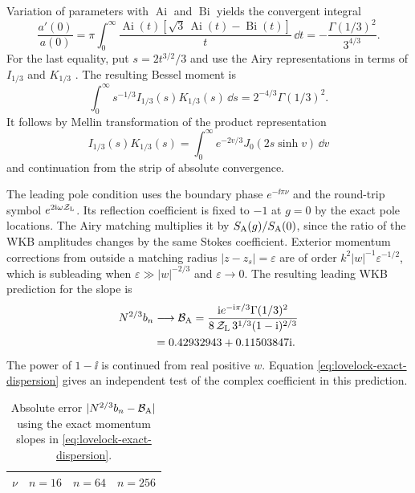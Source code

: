 Variation of parameters with \(\operatorname{Ai}\) and
\(\operatorname{Bi}\) yields the convergent integral
\begin{equation}
 \frac{a'(0)}{a(0)}
 =\pi\int_0^\infty\frac{\operatorname{Ai}(t)
 [\sqrt3\,\operatorname{Ai}(t)-\operatorname{Bi}(t)]}{t}\,\dd t
 =-\frac{\Gamma(1/3)^2}{3^{4/3}}.
 \label{eq:lovelock-airy-moment}
\end{equation}
For the last equality, put \(s=2t^{3/2}/3\) and use the Airy
representations in terms of \(I_{1/3}\) and \(K_{1/3}\) \cite{NIST:DLMF}.
The resulting Bessel moment is
\begin{equation}
 \int_0^\infty s^{-1/3} I_{1/3}(s)K_{1/3}(s)\,\dd s
 =2^{-4/3}\Gamma(1/3)^2.
\end{equation}
It follows by Mellin transformation of the product representation
\begin{equation}
 I_{1/3}(s)K_{1/3}(s)=\int_0^\infty
      e^{-2v/3}J_0(2s\sinh v)\,\dd v
\end{equation}
and continuation from the strip of absolute convergence.

The leading pole condition uses the boundary phase
\(e^{-\ii\pi\nu}\) and the round-trip symbol
\(e^{2\mathrm{i}\omega\mathcal Z_{\rm L}}\). Its reflection coefficient
is fixed to \(-1\) at \(g=0\) by the exact pole locations.
The Airy matching multiplies it by \(S_{\rm A}(g)/S_{\rm A}(0)\),
since the ratio of the WKB amplitudes changes by the same
Stokes coefficient. Exterior momentum corrections from outside
a matching radius \(|z-z_s|=\varepsilon\) are of order
\(k^2 |w|^{-1}\varepsilon^{-1/2}\), which is subleading when
\(\varepsilon\gg |w|^{-2/3}\) and \(\varepsilon\to0\).
The resulting leading WKB prediction for the slope is
\begin{align}
 N^{2/3} b_n &\longrightarrow
 \mathcal B_{\rm A}
 =\frac{\mathrm{i} e^{-\mathrm{i}\pi/3}\Gamma(1/3)^2}
        {8\,\mathcal Z_{\rm L}\,3^{1/3}(1-\mathrm{i})^{2/3}}\notag\\
 &=0.42932943+0.11503847\mathrm{i} .
 \label{eq:lovelock-airy-limit}
\end{align}
The power of \(1-\ii\) is continued from real positive \(w\).
Equation \eqref{eq:lovelock-exact-dispersion} gives an independent
test of the complex coefficient in this prediction.

\begin{table}[t]
 \centering\small
 \begin{tabular}{cccc}
 \hline
 \(\nu\) & \(n=16\) & \(n=64\) & \(n=256\) \\
 \hline
 
 \end{tabular}
 \caption{Absolute error \(\lvert N^{2/3}b_n-\mathcal B_{\rm A}\rvert\)
 using the exact momentum slopes in \eqref{eq:lovelock-exact-dispersion}.}
 \label{tab:lovelock-airy}
\end{table}

